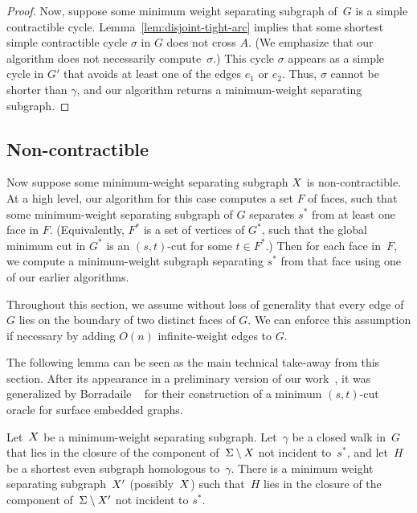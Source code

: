 \documentclass[letterpaper,review]{siamart190516}
\def\subsnip{\mathbin{\raisebox{0.15ex}{\rotatebox[origin=c]{60}{\footnotesize\Rightscissors}\!}}}
\def\Gsnip{\mathord{G_{\subsnip}}}
\def\Gsnip{G'}
\begin{document}
{\begin{proof}
Now, suppose some minimum weight separating subgraph of~$G$ is a simple contractible cycle.
Lemma~\ref{lem:disjoint-tight-arc} implies that some shortest simple contractible cycle $\sigma$ in
$G$ does not cross $A$.  (We emphasize that our algorithm does not necessarily compute~$\sigma$.)  This cycle $\sigma$ appears as a simple cycle in $\Gsnip$ that avoids at least one of the edges $e_1$ or $e_2$.  Thus, $\sigma$ cannot be shorter than $\gamma$, and our algorithm returns a minimum-weight separating subgraph.
\end{proof}


\subsection{Non-contractible}
\label{sec:global_non-contractible}

Now suppose some minimum-weight separating subgraph $X$ is non-contractible.  At a high level,
our algorithm for this case computes a set $F$ of faces, such that some minimum-weight separating
subgraph of $G$ separates $s^*$ from at least one face in $F$.  (Equivalently, $F^*$ is a set of
vertices of $G^*$, such that the global minimum cut in $G^*$ is an $(s,t)$-cut for some $t\in
F^*$.)  Then for each face in~$F$, we compute a minimum-weight subgraph separating $s^*$ from that
face using one of our earlier algorithms.

Throughout this section, we assume without loss of generality that every edge of $G$ lies on the boundary of two distinct faces of $G$.  We can enforce this assumption if necessary by adding $O(n)$ infinite-weight edges to $G$.

The following lemma can be seen as the main technical take-away from this section.
After its appearance in a preliminary version of our work~\cite{efn-gmcse-12}, it was
generalized by Borradaile \etal~\cite{benw-amcnt-16} for their construction of a minimum $(s,t)$-cut
oracle for surface embedded graphs.

\begin{lemma}
\label{lem:global_split-nocross}
Let~$X$ be a minimum-weight separating subgraph.
Let~$\gamma$ be a closed walk in~$G$ that lies in the closure of the component of~$\Sigma \setminus
X$ not incident to~$s^*$, and let~$H$
be a shortest even subgraph homologous to~$\gamma$.
There is a minimum weight separating subgraph~$X'$ (possibly~$X$) such
that~$H$ lies in the closure of the component of~$\Sigma \setminus X'$ not incident to $s^*$. 
\end{lemma}

}
\end{document}
